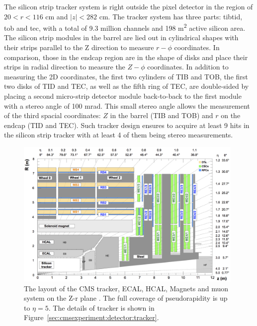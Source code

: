  The silicon strip tracker system is right outside the pixel detector in the region of $20<r<116$ cm and $|z|<282$ cm. The tracker system has three parts: \acrfull{tibtid}, \acrfull{tob} and \acrfull{tec}, with a total of 9.3 million channels and 198 \si{\m \squared} active silicon area. The silicon strip modules in the barrel are lied out in cylindrical shapes with their strips parallel to the Z direction to measure $r-\phi$ coordinates. In comparison, those in the endcap region are in the shape of disks and place their strips in radial direction to measure the $Z-\phi$ coordinates. In addition to measuring the 2D coordinates, the first two cylinders of TIB and TOB, the first two disks of TID and TEC, as well as the fifth ring of TEC, are double-sided by placing a second micro-strip detector module back-to-back to the first module with a stereo angle of 100 mrad. This small stereo angle allows the measurement of the third spacial coordinates: $Z$ in the barrel (TIB and TOB) and $r$ on the endcap (TID and TEC). Such tracker design ensures to acquire at least 9 hits in the silicon strip tracker with at least 4 of them being stereo measurements. 




\begin{figure}[ht]
    \centering
    \includegraphics[width=0.98\textwidth]{chapters/CMSExperiment/sectionDetector/figures/detectorLayout.png}
    \caption{The layout of the CMS tracker, ECAL, HCAL, Magnets and muon system on the Z-r plane \cite{cms:muonChamberWebsite}. The full coverage of pseudorapidity is up to $\eta=5$. The details of tracker is shown in Figure~\ref{sec:cmsexperiment:detector:tracker}. }
    \label{sec:cmsexperiment:detector:detectorLayout}
\end{figure}




